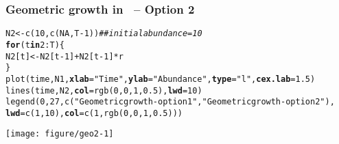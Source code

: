 \documentclass[color=usenames,dvipsnames]{beamer}\usepackage[]{graphicx}\usepackage[]{color}
\makeatletter
\newcommand{\hlnum}[1]{\textcolor[rgb]{0.69,0.494,0}{#1}}%
\newcommand{\hlstr}[1]{\textcolor[rgb]{0.749,0.012,0.012}{#1}}%
\newcommand{\hlcom}[1]{\textcolor[rgb]{0.514,0.506,0.514}{\textit{#1}}}%
\newcommand{\hlopt}[1]{\textcolor[rgb]{0,0,0}{#1}}%
\newcommand{\hlstd}[1]{\textcolor[rgb]{0,0,0}{#1}}%
\newcommand{\hlkwa}[1]{\textcolor[rgb]{0,0,0}{\textbf{#1}}}%
\newcommand{\hlkwb}[1]{\textcolor[rgb]{0,0.341,0.682}{#1}}%
\newcommand{\hlkwc}[1]{\textcolor[rgb]{0,0,0}{\textbf{#1}}}%
\newcommand{\hlkwd}[1]{\textcolor[rgb]{0.004,0.004,0.506}{#1}}%
\newenvironment{kframe}{%
 \def\at@end@of@kframe{}%
 \ifinner\ifhmode%
  \def\at@end@of@kframe{\end{minipage}}%
  \begin{minipage}{\columnwidth}%
 \fi\fi%
 \def\FrameCommand##1{\hskip\@totalleftmargin \hskip-\fboxsep
 \colorbox{shadecolor}{##1}\hskip-\fboxsep
     \hskip-\linewidth \hskip-\@totalleftmargin \hskip\columnwidth}%
 \MakeFramed {\advance\hsize-\width
   \@totalleftmargin\z@ \linewidth\hsize
   \@setminipage}}%
 {\par\unskip\endMakeFramed%
 \at@end@of@kframe}
\newenvironment{knitrout}{}{} %
\makeatother
\begin{document}
\begin{frame}[fragile]
  \frametitle{Geometric growth in \R~-- Option 2}
\begin{knitrout}\tiny
{}\color{fgcolor}\begin{kframe}
\begin{alltt}
\hlstd{N2} \hlkwb{<-} \hlkwd{c}\hlstd{(}\hlnum{10}\hlstd{,} \hlkwd{c}\hlstd{(}\hlnum{NA}\hlstd{, T}\hlopt{-}\hlnum{1}\hlstd{))}  \hlcom{## initial abundance = 10}
\hlkwa{for}\hlstd{(t} \hlkwa{in} \hlnum{2}\hlopt{:}\hlstd{T) \{}
    \hlstd{N2[t]} \hlkwb{<-} \hlstd{N2[t}\hlopt{-}\hlnum{1}\hlstd{]} \hlopt{+} \hlstd{N2[t}\hlopt{-}\hlnum{1}\hlstd{]}\hlopt{*}\hlstd{r}
\hlstd{\}}
\hlkwd{plot}\hlstd{(time, N1,} \hlkwc{xlab}\hlstd{=}\hlstr{"Time"}\hlstd{,} \hlkwc{ylab}\hlstd{=}\hlstr{"Abundance"}\hlstd{,} \hlkwc{type}\hlstd{=}\hlstr{"l"}\hlstd{,} \hlkwc{cex.lab}\hlstd{=}\hlnum{1.5}\hlstd{)}
\hlkwd{lines}\hlstd{(time, N2,} \hlkwc{col}\hlstd{=}\hlkwd{rgb}\hlstd{(}\hlnum{0}\hlstd{,}\hlnum{0}\hlstd{,}\hlnum{1}\hlstd{,}\hlnum{0.5}\hlstd{),} \hlkwc{lwd}\hlstd{=}\hlnum{10}\hlstd{)}
\hlkwd{legend}\hlstd{(}\hlnum{0}\hlstd{,} \hlnum{27}\hlstd{,} \hlkwd{c}\hlstd{(}\hlstr{"Geometric growth - option 1"}\hlstd{,} \hlstr{"Geometric growth - option 2"}\hlstd{),}
       \hlkwc{lwd}\hlstd{=}\hlkwd{c}\hlstd{(}\hlnum{1}\hlstd{,}\hlnum{10}\hlstd{),} \hlkwc{col}\hlstd{=}\hlkwd{c}\hlstd{(}\hlnum{1}\hlstd{,} \hlkwd{rgb}\hlstd{(}\hlnum{0}\hlstd{,}\hlnum{0}\hlstd{,}\hlnum{1}\hlstd{,}\hlnum{0.5}\hlstd{)))}
\end{alltt}
\end{kframe}

{\centering \texttt{[image: figure/geo2-1]} 

}



\end{knitrout}
\end{frame}
\end{document}
